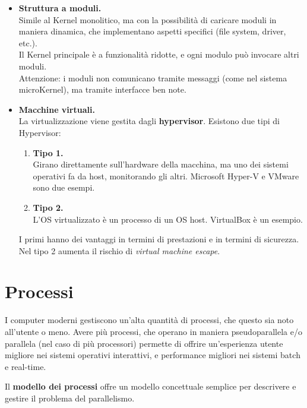 \documentclass{report}
\begin{document}
\begin{itemize}
    Queste restrizioni danno responsabilità singole ad ogni singolo componente di questa struttura, seguendo il \textbf{Principle of Least Authority} (POLA).
    
    \item \textbf{Struttura a moduli.}\\
    Simile al Kernel monolitico, ma con la possibilità di caricare moduli in maniera dinamica, che implementano aspetti specifici (file system, driver, etc.).\\
    Il Kernel principale è a funzionalità ridotte, e ogni modulo può invocare altri moduli.\\
    Attenzione: i moduli non comunicano tramite messaggi (come nel sistema microKernel), ma tramite interfacce ben note.

    \item \textbf{Macchine virtuali.}\\
    La virtualizzazione viene gestita dagli \textbf{hypervisor}. Esistono due tipi di Hypervisor:
    \begin{enumerate}
        \item \textbf{Tipo 1.}\\
        Girano direttamente sull'hardware della macchina, ma uno dei sistemi operativi fa da host, monitorando gli altri. Microsoft Hyper-V e VMware sono due esempi.

        \item \textbf{Tipo 2.}\\
        L'OS virtualizzato è un processo di un OS host. VirtualBox è un esempio.
    \end{enumerate}
    I primi hanno dei vantaggi in termini di prestazioni e in termini di sicurezza. Nel tipo 2 aumenta il rischio di \textit{virtual machine escape}.
\end{itemize}


\chapter{Processi}

I computer moderni gestiscono un'alta quantità di processi, che questo sia noto all'utente o meno. Avere più processi, che operano in maniera pseudoparallela e/o parallela (nel caso di più processori) permette di offrire un'esperienza utente migliore nei sistemi operativi interattivi, e performance migliori nei sistemi batch e real-time. 

Il \textbf{modello dei processi} offre un modello concettuale semplice per descrivere e gestire il problema del parallelismo.
\end{document}
